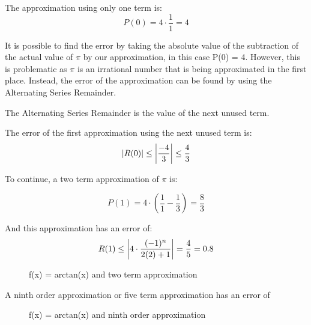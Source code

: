 \documentclass[12pt, titlepage]{article}
\begin{document}
The approximation using only one term is:
\begin{equation*}
  P(0) = 4 \cdot \frac{1}{1} = 4
\end{equation*}

It is possible to find the error by taking the absolute value of  the subtraction of the actual value of \(\pi\) by our approximation, in this case P(0) = 4. However, this is problematic as \(\pi\) is an irrational number that is being approximated in the first place. Instead, the error of the approximation can be found by using the Alternating Series Remainder.

The Alternating Series Remainder is the value of the next unused term.

The error of the first approximation using the next unused term is:
\begin{equation*}
  \abs{R(0)} \leq \abs{\frac{-4}{3}} \leq \frac{4}{3}
\end{equation*}

To continue, a two term approximation of \(\pi\) is:

\begin{equation*}
  P(1) = 4 \cdot (\frac{1}{1} - \frac{1}{3}) = \frac{8}{3} 
\end{equation*}

And this approximation has an error of:
\begin{equation*}
  R(1) \leq  \abs{4 \cdot {\frac{(-1)^n}{2(2)+1}}} = \frac{4}{5} = 0.8
\end{equation*}

\begin{figure}[H]
\centering
    \caption[]{f(x) = arctan(x) and two term approximation}
\end{figure}

A ninth order approximation or five term approximation has an error of 
\begin{figure}[H]
\centering
    \caption[]{f(x) = arctan(x) and ninth order approximation}
\end{figure}
\end{document}
